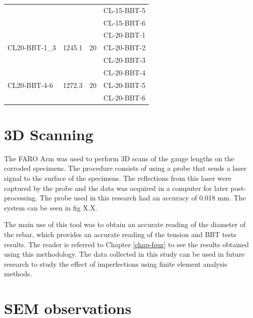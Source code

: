\begin{table}[htbp]
\begin{tabular}{lccl}
                               &                         &                     & CL-15-BBT-5           \\
                               &                         &                     & CL-15-BBT-6           \\
\multirow{3}{*}{CL20-BBT-1\_3} & \multirow{3}{*}{1245.1} & \multirow{3}{*}{20} & CL-20-BBT-1           \\
                               &                         &                     & CL-20-BBT-2           \\
                               &                         &                     & CL-20-BBT-3           \\
\multirow{3}{*}{CL20-BBT-4-6}  & \multirow{3}{*}{1272.3} & \multirow{3}{*}{20} & CL-20-BBT-4           \\
                               &                         &                     & CL-20-BBT-5           \\
                               &                         &                     & CL-20-BBT-6          
\end{tabular}
\end{table}

\section{3D Scanning}

The FARO Arm \cite{FAROTechnologiesInc.2022} was used to perform 3D scans of the gauge lengths on the corroded specimens. The procedure consists of using a probe that sends a laser signal to the surface of   the specimens. The reflections from this laser were captured by the probe and the data was acquired in a computer for later post-processing. The probe used in this research had an accuracy of 0.018 mm. The system can be seen in fig X.X.


The main use of this tool was to obtain an accurate reading of the diameter of the rebar, which provides an accurate reading of the tension and BBT tests results. The reader is referred to Chapter \ref{chap-four} to see the results obtained using this methodology. The data collected in this study can be used in future research to study the effect of imperfections using finite element analysis methods.

\section{SEM observations}

